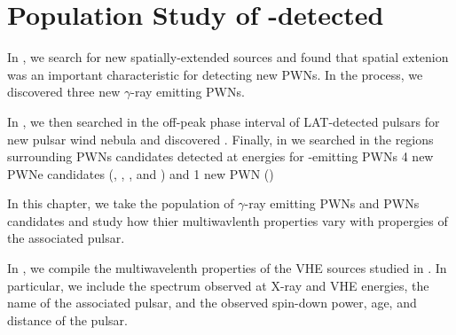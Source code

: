 \chapter{Population Study of -detected }


In , we search for new spatially-extended \fermi
sources and found that spatial extenion was an important characteristic
for detecting new \acp{PWN}. In the process, we discovered three
new $\gamma$-ray emitting \acp{PWN}.  

In , we then
searched in the off-peak phase interval of \ac{LAT}-detected pulsars
for new pulsar wind nebula and discovered \threecfiftyeight.  Finally,
in  we searched in the regions surrounding \acp{PWN}
candidates detected at \tev energies for \gev-emitting \acp{PWN}
4 new PWNe candidates (, , ,
and ) and 1 new PWN ()

In this chapter, we take the population of $\gamma$-ray emitting \acp{PWN}
and \acp{PWN} candidates and study how thier multiwavlenth properties
vary with propergies of the associated pulsar.



In , we compile the multiwavelenth
properties of the \ac{VHE} sources studied in . In
particular, we include the spectrum observed at X-ray and \ac{VHE}
energies, the name of the associated pulsar, and the observed spin-down
power, age, and distance of the pulsar.




